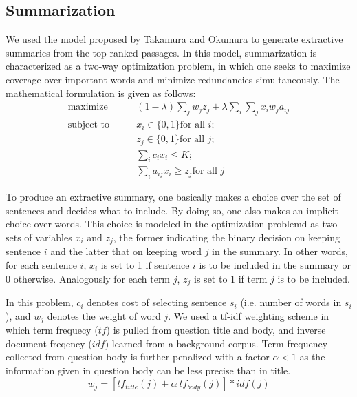 \documentclass[a4paper,10pt,conference,compsocconf,final]{IEEEtran}
\begin{document}
{{{{\subsection{Summarization}
\label{sec:sum}

We used the model proposed by Takamura and Okumura \cite{takamura2009text} to
generate extractive summaries from the top-ranked passages.  In this model,
summarization is characterized as a two-way optimization problem, in which one
seeks to maximize coverage over important words and minimize redundancies
simultaneously.  The mathematical formulation is given as follows:
\begin{equation}
\begin{split}
  \textrm{maximize} \qquad & (1-\lambda) \sum_{j} w_j z_j + \lambda \sum_{i}\sum_{j} x_i w_j a_{ij} \\
  \textrm{subject to} \qquad 
       & x_i \in \{0,1\} \textrm{for all $i$}; \\ 
       & z_j \in \{0,1\} \textrm{for all $j$}; \\
       & \sum_{i} c_ix_i \le K; \\
       & \sum_{i}^{} a_{ij}x_i \ge z_j \textrm{for all $j$} 
\end{split}
\end{equation}

To produce an extractive summary, one basically makes a choice over the set of
sentences and decides what to include.  By doing so, one also makes an implicit
choice over words.  This choice is modeled in the optimization problemd as two
sets of variables $x_i$ and $z_j$, the former indicating the binary decision on
keeping sentence $i$ and the latter that on keeping word $j$ in the summary.
In other words, for each sentence $i$, $x_i$ is set to 1 if sentence $i$ is to
be included in the summary or 0 otherwise.  Analogously for each term $j$,
$z_j$ is set to 1 if term $j$ is to be included.

In this problem, $c_i$ denotes cost of selecting sentence $s_i$ (i.e. number of
words in $s_i$), and $w_j$ denotes the weight of word $j$.  We used a tf-idf
weighting scheme in which term frequecy ($tf$) is pulled from question title
and body, and inverse document-freqency ($idf$) learned from a background
corpus.  Term frequency collected from question body is further penalized with
a factor $\alpha < 1$ as the information given in question body can be less
precise than in title.
\begin{equation}
  w_j = \left[ tf_{title}(j) + \alpha ~ tf_{body}(j) \right] * idf(j)
\end{equation}

}}}}
\end{document}
